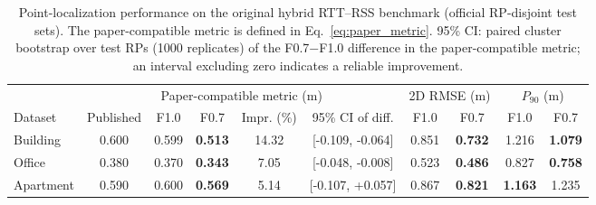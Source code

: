 \begin{table}[!t]
\centering
\caption{Point-localization performance on the original hybrid RTT--RSS benchmark (official RP-disjoint test sets). The paper-compatible metric is defined in Eq.~\eqref{eq:paper_metric}. 95\% CI: paired cluster bootstrap over test RPs (1000 replicates) of the F0.7$-$F1.0 difference in the paper-compatible metric; an interval excluding zero indicates a reliable improvement.}
\label{tab:original_accuracy}
\footnotesize
\setlength{\tabcolsep}{4pt}
\begin{tabular}{lccccccccc}
\toprule
 & \multicolumn{5}{c}{Paper-compatible metric (m)} & \multicolumn{2}{c}{2D RMSE (m)} & \multicolumn{2}{c}{$P_{90}$ (m)} \\
\cmidrule(lr){2-6}\cmidrule(lr){7-8}\cmidrule(lr){9-10}
Dataset & Published & F1.0 & F0.7 & Impr. (\%) & 95\% CI of diff. & F1.0 & F0.7 & F1.0 & F0.7 \\
\midrule
Building & 0.600 & 0.599 & \textbf{0.513} & 14.32 & [-0.109, -0.064] & 0.851 & \textbf{0.732} & 1.216 & \textbf{1.079} \\
Office & 0.380 & 0.370 & \textbf{0.343} & 7.05 & [-0.048, -0.008] & 0.523 & \textbf{0.486} & 0.827 & \textbf{0.758} \\
Apartment & 0.590 & 0.600 & \textbf{0.569} & 5.14 & [-0.107, +0.057] & 0.867 & \textbf{0.821} & \textbf{1.163} & 1.235 \\
\bottomrule
\end{tabular}
\end{table}
